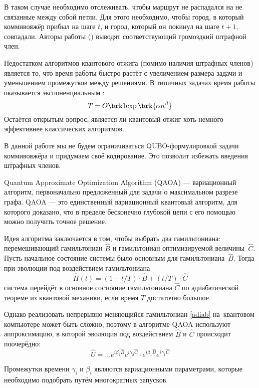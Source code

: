 В таком случае необходимо отслеживать, чтобы маршрут не распадался на не связанные между собой петли.
Для этого необходимо, чтобы город, в который коммивояжёр прибыл на шаге $t$, и город, который он покинул на шаге $t+1$, совпадали. Авторы работы \cite{QUBO-TSP} (\citeyear{QUBO-TSP}) выводят соответствующий громоздкий штрафной член.

Недостатком алгоритмов квантового отжига (помимо наличия штрафных членов) является то, что время работы быстро растёт с увеличением размера задачи и уменьшением промежутков между решениями. В типичных задачах время работы оказывается экспоненциальным \cite{allQUBOs}:
$$
T = O\brk1{\exp\brk{\alpha n ^ \beta}}
$$
Остаётся открытым вопрос, является ли квантовый отжиг хоть немного эффективнее классических алгоритмов.

В данной работе мы не будем ограничиваться QUBO-формулировкой задачи коммивояжёра и придумаем своё кодирование. Это позволит избежать введения штрафных членов.


Quantum Approximate Optimization Algorithm (QAOA) \cite{QAOA} --- вариационный алгоритм, первоначально предложенный для задачи о максимальном разрезе графа. QAOA --- это единственный вариационный квантовый алгоритм, для которого доказано, что в пределе бесконечно глубокой цепи с его помощью можно получить точное решение.

Идея алгоритма заключается в том, чтобы выбрать два гамильтониана: перемешивающий гамильтониан $\hat B$ и гамильтониан оптимизируемой величины~$\hat C$. Пусть начальное состояние системы было основным для гамильтониана~$\hat B$. Тогда при эволюции под воздействием гамильтониана
\begin{equation}
\hat H(t) = (1-t/T) \cdot \hat B + (t/T) \cdot \hat C
\label{adiab}
\end{equation}
система перейдёт в основное состояние гамильтониана $\hat C$ по адиабатической теореме из квантовой механики, если время $T$ достаточно большое.

Однако реализовать непрерывно меняющийся гамильтониан \eqref{adiab} на~квантовом компьютере может быть сложно, поэтому в алгоритме QAOA используют аппроксимацию, в которой эволюция под воздействием $\hat B$ и $\hat C$ происходит поочерёдно:
$$
\hat U = \dots e^{i \beta_2 \hat B} e^{i \gamma_2 \hat C} \cdot e^{i \beta_1 \hat B} e^{i \gamma_1 \hat C}
$$

Промежутки времени $\gamma_i$ и $\beta_i$ являются вариационными параметрами, которые необходимо подобрать путём многократных запусков.

